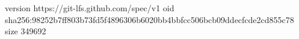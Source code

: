 version https://git-lfs.github.com/spec/v1
oid sha256:98252b7ff803b73fd5f4896306b6020bb4bbfcc506bcb09ddecfcde2cd855c78
size 349692
